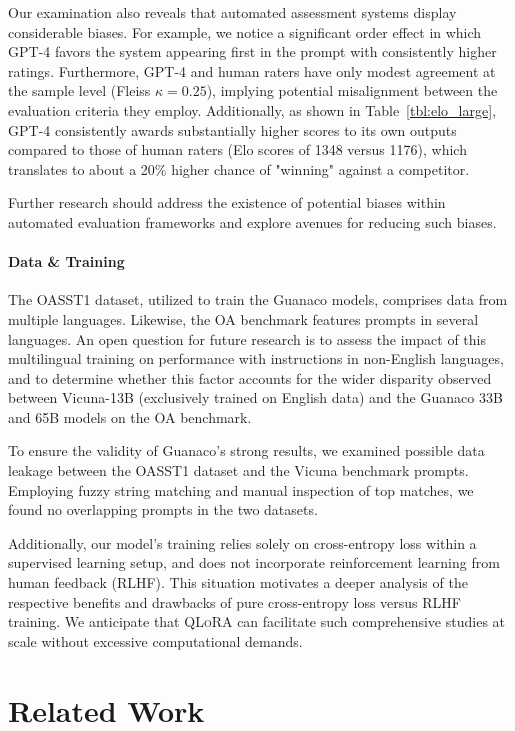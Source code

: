 Our examination also reveals that automated assessment systems display considerable biases. For example, we notice a significant order effect in which GPT-4 favors the system appearing first in the prompt with consistently higher ratings. Furthermore, GPT-4 and human raters have only modest agreement at the sample level (Fleiss $\kappa=0.25$), implying potential misalignment between the evaluation criteria they employ. Additionally, as shown in Table~\ref{tbl:elo_large}, GPT-4 consistently awards substantially higher scores to its own outputs compared to those of human raters (Elo scores of 1348 versus 1176), which translates to about a 20\% higher chance of "winning" against a competitor.

Further research should address the existence of potential biases within automated evaluation frameworks and explore avenues for reducing such biases.

\paragraph{Data \& Training} The OASST1 dataset, utilized to train the {Guanaco} models, comprises data from multiple languages. Likewise, the OA benchmark features prompts in several languages. An open question for future research is to assess the impact of this multilingual training on performance with instructions in non-English languages, and to determine whether this factor accounts for the wider disparity observed between Vicuna-13B (exclusively trained on English data) and the {Guanaco} 33B and 65B models on the OA benchmark.

To ensure the validity of {Guanaco}'s strong results, we examined possible data leakage between the OASST1 dataset and the Vicuna benchmark prompts. Employing fuzzy string matching and manual inspection of top matches, we found no overlapping prompts in the two datasets.

Additionally, our model’s training relies solely on cross-entropy loss within a supervised learning setup, and does not incorporate reinforcement learning from human feedback (RLHF). This situation motivates a deeper analysis of the respective benefits and drawbacks of pure cross-entropy loss versus RLHF training. We anticipate that \textsc{QLoRA} can facilitate such comprehensive studies at scale without excessive computational demands.

\section{Related Work}

